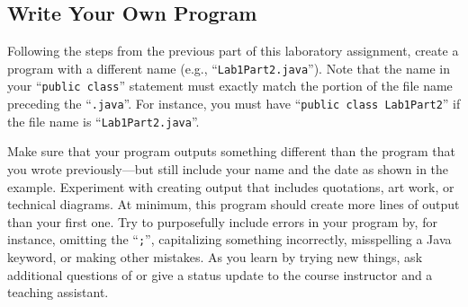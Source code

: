 



\subsection*{Write Your Own Program}

Following the steps from the previous part of this laboratory assignment, create a program with a different name (e.g.,
``{\tt Lab1Part2.java}''). Note that the name in your ``{\tt public class}'' statement must exactly match the portion of
the file name preceding the ``{\tt .java}''.  For instance, you must have ``{\tt public class Lab1Part2}'' if the file
name is ``{\tt Lab1Part2.java}''.

Make sure that your program outputs something different than the program that you wrote previously---but still include
your name and the date as shown in the example. Experiment with creating output that includes quotations, art work, or
technical diagrams.  At minimum, this program should create more lines of output than your first one. Try to
purposefully include errors in your program by, for instance, omitting the ``{\tt ;}'', capitalizing something
incorrectly, misspelling a Java keyword, or making other mistakes. As you learn by trying new things, ask additional
questions of or give a status update to the course instructor and a teaching assistant.

